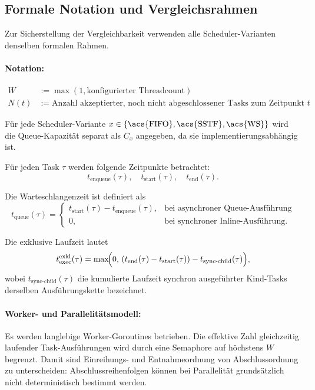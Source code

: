 \begin{sloppypar}
\subsection{Formale Notation und Vergleichsrahmen}

Zur Sicherstellung der Vergleichbarkeit verwenden alle Scheduler-Varianten denselben formalen Rahmen.

\paragraph{Notation:}
\begin{align*}
W &:= \max(1,\text{konfigurierter Threadcount}) \\
N(t) &:= \text{Anzahl akzeptierter, noch nicht abgeschlossener Tasks zum Zeitpunkt } t
\end{align*}

\noindent Für jede Scheduler-Variante $x \in \{\text{\acs{FIFO}},\text{\acs{SSTF}},\text{\acs{WS}}\}$ wird die Queue-Kapazität separat als $C_x$ angegeben, da sie implementierungsabhängig ist.

\noindent Für jeden Task $\tau$ werden folgende Zeitpunkte betrachtet:
\[
t_{\mathrm{enqueue}}(\tau),\quad t_{\mathrm{start}}(\tau),\quad t_{\mathrm{end}}(\tau).
\]

\noindent Die Warteschlangenzeit ist definiert als
\[
t_{\mathrm{queue}}(\tau)=
\begin{cases}
t_{\mathrm{start}}(\tau)-t_{\mathrm{enqueue}}(\tau), & \text{bei asynchroner Queue-Ausführung}\\
0, & \text{bei synchroner Inline-Ausführung}.
\end{cases}
\]

\noindent Die exklusive Laufzeit lautet
\[
t_{\mathrm{exec}}^{\mathrm{exkl}}(\tau)=
\max\!\Bigl(0,\,(t_{\mathrm{end}}(\tau)-t_{\mathrm{start}}(\tau))-t_{\mathrm{sync\text{-}child}}(\tau)\Bigr),
\]
wobei $t_{\mathrm{sync\text{-}child}}(\tau)$ die kumulierte Laufzeit synchron ausgeführter Kind-Tasks derselben Ausführungskette bezeichnet.

\paragraph{Worker- und Parallelitätsmodell:}
Es werden langlebige Worker-Goroutines betrieben. Die effektive Zahl gleichzeitig laufender Task-Ausführungen wird durch eine Semaphore auf höchstens $W$ begrenzt.
Damit sind Einreihungs- und Entnahmeordnung von Abschlussordnung zu unterscheiden: Abschlussreihenfolgen können bei Parallelität grundsätzlich nicht
deterministisch bestimmt werden.


\end{sloppypar}
